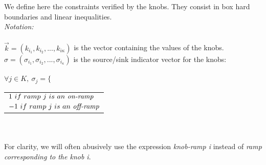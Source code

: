 We define here the constraints verified by the knobs. They consist in box hard boundaries and linear inequalities.
\\
\emph{Notation:}\\
\\
$\vec{k}=(k_{i_{1}},k_{i_{2}},...,k_{i{\kappa}})$ is the vector containing the values of the knobs.\\
$\sigma=(\sigma_{i_{1}},\sigma_{i_{2}},...,\sigma_{i_{\kappa}})$ is the source/sink indicator vector for the knobs: \\
\\
$\forall j\in{K}, \ \sigma_{j}=\bigg\{$
\begin{tabular}{l}
	$1\ if\ ramp\ j\ is\ an\ \emph{on-ramp}$ \\
	$-1\ if\ ramp\ j\ is\ an\ \emph{off-ramp}$ \\
\end{tabular}\\
\\
For clarity, we will often abusively use the expression \emph{knob-ramp i} instead of \emph{ramp corresponding to the knob i}.\\